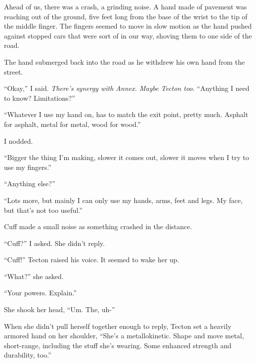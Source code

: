 Ahead of us, there was a crash, a grinding noise.  A hand made of pavement was reaching out of the ground, five feet long from the base of the wrist to the tip of the middle finger.  The fingers seemed to move in slow motion as the hand pushed against stopped cars that were sort of in our way, shoving them to one side of the road.



The hand submerged back into the road as he withdrew his own hand from the street.



``Okay,'' I said.  \emph{There's synergy with Annex.  Maybe Tecton too}.  ``Anything I need to know?  Limitations?''



``Whatever I use my hand on, has to match the exit point, pretty much.  Asphalt for asphalt, metal for metal, wood for wood.''



I nodded.



``Bigger the thing I'm making, slower it comes out, slower it moves when I try to use my fingers.''



``Anything else?''



``Lots more, but mainly I can only use my hands, arms, feet and legs.  My face, but that's not too useful.''



Cuff made a small noise as something crashed in the distance.



``Cuff?'' I asked.  She didn't reply.



``Cuff!'' Tecton raised his voice.  It seemed to wake her up.



``What?'' she asked.



``Your powers.  Explain.''



She shook her head, ``Um.  The, uh-''



When she didn't pull herself together enough to reply, Tecton set a heavily armored hand on her shoulder, ``She's a metallokinetic.  Shape and move metal, short-range, including the stuff she's wearing.  Some enhanced strength and durability, too.''



